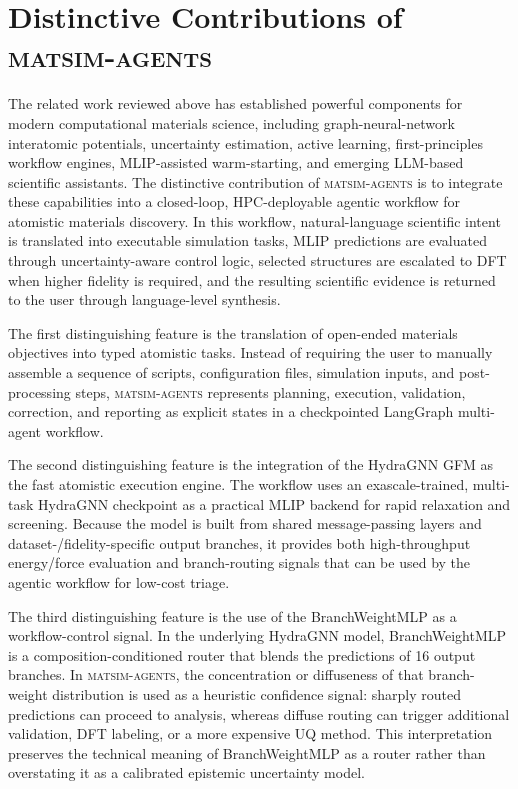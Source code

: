 \documentclass[conference]{IEEEtran}
\def\acs#1{#1}%
\begin{document}
\section{Distinctive Contributions of \textsc{matsim-agents}}
\label{sec:contributions}

The related work reviewed above has established powerful components for modern
computational materials science, including graph-neural-network interatomic
potentials, uncertainty estimation, active learning, first-principles workflow
engines, \acs{MLIP}-assisted warm-starting, and emerging \acs{LLM}-based
scientific assistants. The distinctive contribution of \textsc{matsim-agents}
is to integrate these capabilities into a closed-loop, \acs{HPC}-deployable
agentic workflow for atomistic materials discovery. In this workflow,
natural-language scientific intent is translated into executable simulation
tasks, \acs{MLIP} predictions are evaluated through uncertainty-aware control
logic, selected structures are escalated to \acs{DFT} when higher fidelity is
required, and the resulting scientific evidence is returned to the user through
language-level synthesis.

The first distinguishing feature is the translation of open-ended materials
objectives into typed atomistic tasks. Instead of requiring the user to manually
assemble a sequence of scripts, configuration files, simulation inputs, and
post-processing steps, \textsc{matsim-agents} represents planning, execution,
validation, correction, and reporting as explicit states in a checkpointed
LangGraph multi-agent workflow.

The second distinguishing feature is the integration of the HydraGNN
\acs{GFM} as the fast atomistic execution engine. The workflow uses an
exascale-trained, multi-task HydraGNN checkpoint as a practical \acs{MLIP}
backend for rapid relaxation and screening. Because the model is built from
shared message-passing layers and dataset-/fidelity-specific output branches,
it provides both high-throughput energy/force evaluation and branch-routing
signals that can be used by the agentic workflow for low-cost triage.

The third distinguishing feature is the use of the BranchWeightMLP as a
workflow-control signal. In the underlying HydraGNN model, BranchWeightMLP is a
composition-conditioned router that blends the predictions of 16 output
branches. In \textsc{matsim-agents}, the concentration or diffuseness of that
branch-weight distribution is used as a heuristic confidence signal: sharply
routed predictions can proceed to analysis, whereas diffuse routing can trigger
additional validation, \acs{DFT} labeling, or a more expensive \acs{UQ} method.
This interpretation preserves the technical meaning of BranchWeightMLP as a
router rather than overstating it as a calibrated epistemic uncertainty model.
\end{document}
